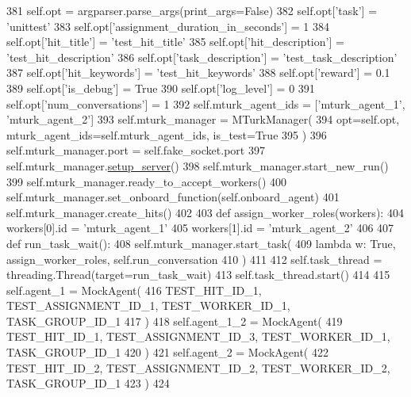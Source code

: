 \begin{DoxyCode}
381         self.opt = argparser.parse\_args(print\_args=\textcolor{keyword}{False})
382         self.opt[\textcolor{stringliteral}{'task'}] = \textcolor{stringliteral}{'unittest'}
383         self.opt[\textcolor{stringliteral}{'assignment\_duration\_in\_seconds'}] = 1
384         self.opt[\textcolor{stringliteral}{'hit\_title'}] = \textcolor{stringliteral}{'test\_hit\_title'}
385         self.opt[\textcolor{stringliteral}{'hit\_description'}] = \textcolor{stringliteral}{'test\_hit\_description'}
386         self.opt[\textcolor{stringliteral}{'task\_description'}] = \textcolor{stringliteral}{'test\_task\_description'}
387         self.opt[\textcolor{stringliteral}{'hit\_keywords'}] = \textcolor{stringliteral}{'test\_hit\_keywords'}
388         self.opt[\textcolor{stringliteral}{'reward'}] = 0.1
389         self.opt[\textcolor{stringliteral}{'is\_debug'}] = \textcolor{keyword}{True}
390         self.opt[\textcolor{stringliteral}{'log\_level'}] = 0
391         self.opt[\textcolor{stringliteral}{'num\_conversations'}] = 1
392         self.mturk\_agent\_ids = [\textcolor{stringliteral}{'mturk\_agent\_1'}, \textcolor{stringliteral}{'mturk\_agent\_2'}]
393         self.mturk\_manager = MTurkManager(
394             opt=self.opt, mturk\_agent\_ids=self.mturk\_agent\_ids, is\_test=\textcolor{keyword}{True}
395         )
396         self.mturk\_manager.port = self.fake\_socket.port
397         self.mturk\_manager.\hyperlink{namespaceparlai_1_1chat__service_1_1services_1_1messenger_1_1server__utils_afb56b04206cd0f42384438f1ac6d9cda}{setup\_server}()
398         self.mturk\_manager.start\_new\_run()
399         self.mturk\_manager.ready\_to\_accept\_workers()
400         self.mturk\_manager.set\_onboard\_function(self.onboard\_agent)
401         self.mturk\_manager.create\_hits()
402 
403         \textcolor{keyword}{def }assign\_worker\_roles(workers):
404             workers[0].id = \textcolor{stringliteral}{'mturk\_agent\_1'}
405             workers[1].id = \textcolor{stringliteral}{'mturk\_agent\_2'}
406 
407         \textcolor{keyword}{def }run\_task\_wait():
408             self.mturk\_manager.start\_task(
409                 \textcolor{keyword}{lambda} w: \textcolor{keyword}{True}, assign\_worker\_roles, self.run\_conversation
410             )
411 
412         self.task\_thread = threading.Thread(target=run\_task\_wait)
413         self.task\_thread.start()
414 
415         self.agent\_1 = MockAgent(
416             TEST\_HIT\_ID\_1, TEST\_ASSIGNMENT\_ID\_1, TEST\_WORKER\_ID\_1, TASK\_GROUP\_ID\_1
417         )
418         self.agent\_1\_2 = MockAgent(
419             TEST\_HIT\_ID\_1, TEST\_ASSIGNMENT\_ID\_3, TEST\_WORKER\_ID\_1, TASK\_GROUP\_ID\_1
420         )
421         self.agent\_2 = MockAgent(
422             TEST\_HIT\_ID\_2, TEST\_ASSIGNMENT\_ID\_2, TEST\_WORKER\_ID\_2, TASK\_GROUP\_ID\_1
423         )
424 
\end{DoxyCode}
